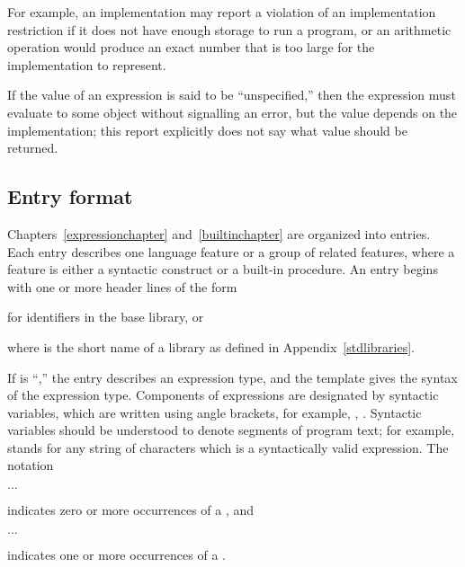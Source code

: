 \vest For example, an implementation may report a violation of an
implementation restriction if it does not have enough storage to run a
program,
or an arithmetic operation would produce an exact number that is
too large for the implementation to represent.

\vest If the value of an expression is said to be ``unspecified,'' then
the expression must evaluate to some object without signalling an error,
but the value depends on the implementation; this report explicitly does
not say what value should be returned. 



\subsection{Entry format}

Chapters~\ref{expressionchapter} and~\ref{builtinchapter} are organized
into entries.  Each entry describes one language feature or a group of
related features, where a feature is either a syntactic construct or a
built-in procedure.  An entry begins with one or more header lines of the form

\noindent{}\unpenalty

for identifiers in the {\cf base} library, or

\noindent{}\unpenalty

where  is the short name of a library
as defined in Appendix~\ref{stdlibraries}.

If  is ``\exprtype,'' the entry describes an expression
type, and the template gives the syntax of the expression type.
Components of expressions are designated by syntactic variables, which
are written using angle brackets, for example, ,
.  Syntactic variables should be understood to denote segments of
program text; for example,  stands for any string of
characters which is a syntactically valid expression.  The notation
\begin{tabbing}
\qquad {} $\ldots$
\end{tabbing}
indicates zero or more occurrences of a , and
\begin{tabbing}
\qquad {}  $\ldots$
\end{tabbing}
indicates one or more occurrences of a .

